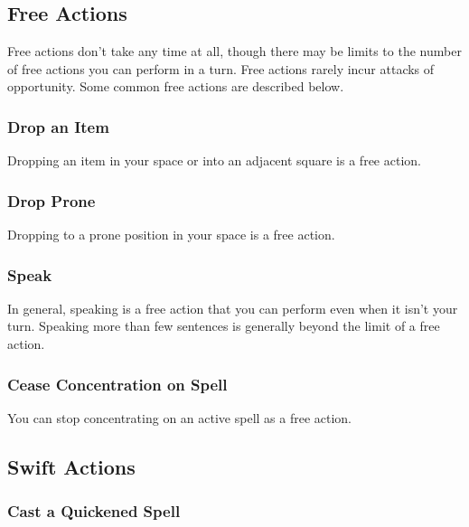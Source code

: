 \subsection{Free Actions}

Free actions don't take any time at all, though there may be limits to the number of free actions you can perform in a turn. Free actions rarely incur attacks of opportunity. Some common free actions are described below.

\subsubsection{Drop an Item}

Dropping an item in your space or into an adjacent square is a free action.

\subsubsection{Drop Prone}

Dropping to a prone position in your space is a free action.

\subsubsection{Speak}

In general, speaking is a free action that you can perform even when it isn't your turn. Speaking more than few sentences is generally beyond the limit of a free action.

\subsubsection{Cease Concentration on Spell}

You can stop concentrating on an active spell as a free action.

\subsection{Swift Actions}

\subsubsection{Cast a Quickened Spell}

